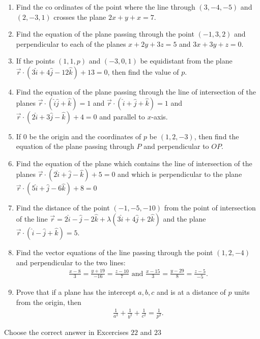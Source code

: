 \documentclass{article}
\theoremstyle{remark}
\begin{document}
\begin{enumerate}
\item Find the co ordinates of the point where the line through $(3,-4,-5)$ and $(2,-3,1)$ crosses the plane $2x+y+x=7$.
\item Find the equation of the plane passing through the point $(-1,3,2)$ and perpendicular to each of the planes $x+2y+3z=5$ and $3x+3y+z=0$.
\item If the points $(1,1,p)$ and $(-3,0,1)$ be equidistant from the plane $\overrightarrow{r}\cdot(3\hat{i}+4\hat{j}-12\hat{k})+13=0$, then find the value of $p$.
\item Find the equation of the plane passing through the line of intersection of the planes $\overrightarrow{r}\cdot(\hat{i}\hat{j}+\hat{k})=1$ and $\overrightarrow{r}\cdot(\hat{i}+\hat{j}+\hat{k})=1$ and $\overrightarrow{r}\cdot(2\hat{i}+3\hat{j}-\hat{k})+4=0$ and parallel to $x$-axis.
\item If $0$ be the origin and the coordinates of $p$ be $(1,2,-3)$, then find the equation of the plane passing through $P$ and perpendicular to $OP$.
\item Find the equation of the plane which contains the line of intersection of the planes $\overrightarrow{r}\cdot(2\hat{i}+\hat{j}-\hat{k})+5=0$ and which is perpendicular to the plane $\overrightarrow{r}\cdot(5\hat{i}+\hat{j}-6\hat{k})+8=0$
\item Find the distance of the point $(-1,-5,-10)$ from the point of intersection of the line $\overrightarrow{r}=2\hat{i}-\hat{j}-2\hat{k}+\lambda(3\hat{i}+4\hat{j}+2\hat{k})$ and the plane $\overrightarrow{r}\cdot(\hat{i}-\hat{j}+\hat{k})=5$.
\item Find the vector equations of the line passing through the point $(1,2,-4)$ and perpendicular to the two lines:
\begin{align}
\frac{x-8}{3}=\frac{y+19}{-16}=\frac{z-10}{7}\text{ and } \frac{x-15}{3}=\frac{y-29}{8}=\frac{z-5}{-5}.
\end{align}
\item Prove that if a plane has the intercept $a,b,c$ and is at a distance of $p$ units  from the origin, then
\begin{align}
\frac{1}{a^2}+\frac{1}{b^2}+\frac{1}{c^2}=\frac{1}{p^2}.
\end{align}
\end{enumerate}
Choose the correct answer in Excercises $22$ and $23$
\end{document}
